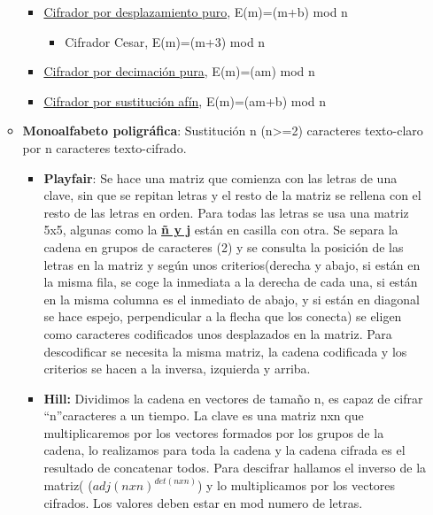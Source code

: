 \documentclass[12pt, twoside, openright]{report} %
\begin{document}
\begin{itemize}
\begin{itemize}
      \begin{itemize}
      \item \underline{Cifrador por desplazamiento puro}, E(m)=(m+b) mod n
        

        \begin{itemize}
        \item Cifrador Cesar, E(m)=(m+3) mod n
          
        \end{itemize}
      \item \underline{Cifrador por decimación pura}, E(m)=(am) mod n
        
      \item \underline{Cifrador por sustitución afín}, E(m)=(am+b) mod n
        
      \end{itemize}
    \item \textbf{Monoalfabeto poligráfica}: Sustitución n (n\textgreater=2)
      caracteres texto-claro por n caracteres texto-cifrado.
      

      \begin{itemize}
      \item \textbf{Playfair}: Se hace una matriz que comienza con las
        letras de una clave, sin que se repitan letras y el resto de la
        matriz se rellena con el resto de las letras en orden. Para
        todas las letras se usa una matriz 5x5, algunas como la
        \textbf{\underline{ñ y j}} están en casilla con otra. Se separa
        la cadena en grupos de caracteres (2) y se consulta la posición
        de las letras en la matriz y según unos criterios(derecha y
        abajo, si están en la misma fila, se coge la inmediata a la
        derecha de cada una, si están en la misma columna es el
        inmediato de abajo, y si están en diagonal se hace espejo,
        perpendicular a la flecha que los conecta) se eligen como
        caracteres codificados unos desplazados en la matriz. Para
        descodificar se necesita la misma matriz, la cadena codificada y
        los criterios se hacen a la inversa, izquierda y arriba.
        
      \item \textbf{Hill:} Dividimos la cadena en vectores de tamaño n, es
        capaz de cifrar ``n''caracteres a un tiempo. La clave es una
        matriz nxn que multiplicaremos por los vectores formados por los
        grupos de la cadena, lo realizamos para toda la cadena y la
        cadena cifrada es el resultado de concatenar todos. Para
        descifrar hallamos el inverso de la matriz(
        ($adj(nxn)^{det(nxn)}$) y lo multiplicamos por los vectores
        cifrados. Los valores deben estar en mod numero de letras.
        

\end{itemize}
\end{itemize}
\end{itemize}
\end{document}
